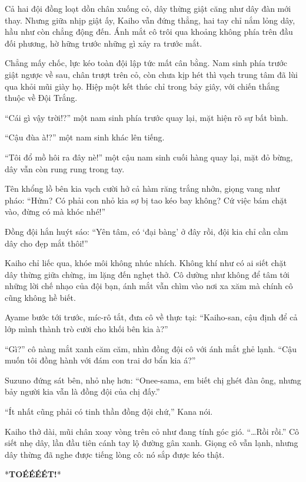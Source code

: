 \documentclass[../main.tex]{subfiles}
\begin{document}
Cả hai đội đồng loạt dồn chân xuống cỏ, dây thừng giật căng như dây đàn mới thay. Nhưng giữa nhịp giật ấy, Kaiho vẫn đứng thẳng, hai tay chỉ nắm lỏng dây, hầu như còn chẳng động đến. Ánh mắt cô trôi qua khoảng không phía trên đầu đối phương, hờ hững trước những gì xảy ra trước mắt.

Chẳng mấy chốc, lực kéo toàn đội lập tức mất cân bằng. Nam sinh phía trước giật ngược về sau, chân trượt trên cỏ, còn chưa kịp hét thì vạch trung tâm đã lùi qua khỏi mũi giày họ. Hiệp một kết thúc chỉ trong bảy giây, với chiến thắng thuộc về Đội Trắng.

``Cái gì vậy trời!?'' một nam sinh phía trước quay lại, mặt hiện rõ sự bất bình.

``Cậu đùa à!?''  một nam sinh khác lên tiếng.

``Tôi đổ mồ hôi ra đây nè!'' một cậu nam sinh cuối hàng quay lại, mặt đỏ bừng, dây vẫn còn rung rung trong tay.

Tên khổng lồ bên kia vạch cười hở cả hàm răng trắng nhởn, giọng vang như pháo: ``Hửm? Có phải con nhỏ kia sợ bị tao kéo bay không? Cứ việc bám chặt vào, đừng có mà khóc nhé!''

Đồng đội hắn huýt sáo:  ``Yên tâm, có `đại bàng' ở đây rồi, đội kia chỉ cần cầm dây cho đẹp mắt thôi!''

Kaiho chỉ liếc qua, khóe môi không nhúc nhích. Không khí như có ai siết chặt dây thừng giữa chừng, im lặng đến nghẹt thở. Cô dường như không để tâm tới những lời chế nhạo của đội bạn, ánh mắt vẫn chìm vào nơi xa xăm mà chính cô cũng không hề biết.

Ayame bước tới trước, míc-rô tắt, đưa cô về thực tại: ``Kaiho-san, cậu định để cả lớp mình thành trò cười cho khối bên kia à?''

``Gì?'' cô nàng mắt xanh căm căm, nhìn đồng đội cô với ánh mắt ghẻ lạnh. ``Cậu muốn tôi đồng hành với đám con trai dơ bẩn kia á?''

Suzuno đứng sát bên, nhỏ nhẹ hơn: ``Onee-sama, em biết chị ghét đàn ông, nhưng bảy người kia vẫn là đồng đội của chị đấy.''

``Ít nhất cũng phải có tinh thần đồng đội chứ,'' Kana nói.

Kaiho thở dài, mũi chân xoay vòng trên cỏ như đang tính góc gió. ``\dots Rồi rồi.'' Cô siết nhẹ dây, lần đầu tiên cánh tay lộ đường gân xanh.  Giọng cô vẫn lạnh, nhưng dây thừng đã nghe được tiếng lòng cô: nó sắp được kéo thật.

\ct

*\textbf{TOÉÉÉÉT!}*
\end{document}
